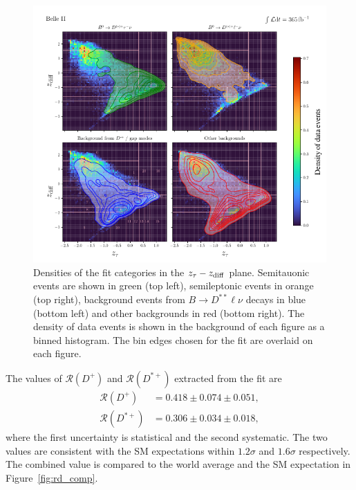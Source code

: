 \documentclass{moriond}
\def\bea{\begin{eqnarray}}
\def\eea{\end{eqnarray}}
\def\zdiff{z_{\rm diff}}
\def\rdp{\mathcal{R}\left(D^+\right)}
\def\rdstp{\mathcal{R}\left(D^{*+}\right)}
\begin{document}
\begin{figure}[h!]
    \centering
    \includegraphics[scale=0.8]{2d_rd.pdf}
    \caption{Densities of the fit categories in the $z_\tau-\zdiff$ plane. Semitauonic events are shown in green (top left), semileptonic events in orange (top right), background events from $B \to D^{**}\ell\nu$ decays in blue (bottom left) and other backgrounds in red (bottom right). The density of data events is shown in the background of each figure as a binned histogram. The bin edges chosen for the fit are overlaid on each figure.}
    \label{fig:2d_rd}
\end{figure}
The values of $\rdp$ and $\rdstp$ extracted from the fit are
\bea
    \rdp &= 0.418 \pm 0.074 \pm 0.051, \\
    \rdstp &= 0.306 \pm 0.034 \pm 0.018,
\eea
where the first uncertainty is statistical and the second systematic. The two values are consistent with the SM expectations within $1.2\sigma$ and $1.6\sigma$ respectively. The combined value is compared to the world average and the SM expectation in Figure~\ref{fig:rd_comp}.
\end{document}
